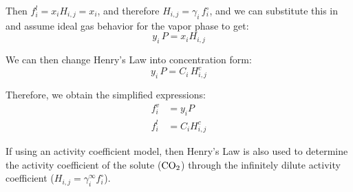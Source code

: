 \documentclass[a4paper,fleqn]{cas-sc}
\newcommand{\COtwo}{{\ce{CO2}}}
\begin{document}
    Then $f_i^l = x_i H_{i,j} = x_i$, and therefore $H_{i,j} = \gamma_i \, f_i^\circ$, and we can substitute this in and assume ideal gas behavior for the vapor phase to get:
    \begin{equation}
        y_i\, P = x_i H_{i,j}
    \end{equation}

    We can then change Henry's Law into concentration form:
    \begin{equation}
        y_i \, P = C_i \, H^{c}_{i,j}
    \end{equation}

    Therefore, we obtain the simplified expressions:
    \begin{align}
        f_i^v &= y_i P \\
        f_i^l &= C_i H^{c}_{i,j}
    \end{align}

    If using an activity coefficient model, then Henry's Law is also used to determine the activity coefficient of the solute ($\COtwo$) through the infinitely dilute activity coefficient ($H_{i,j} = \gamma^{\infty}_i f^{\circ}_i$).
\end{document}

